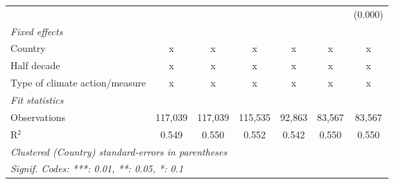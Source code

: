 \begin{tabular}{lcccccc}
                                                     &         &                &               &                &                & (0.000)\\   
   \emph{Fixed effects}\\
   Country                                           & x       & x              & x             & x              & x              & x\\  
   Half decade                                       & x       & x              & x             & x              & x              & x\\  
   Type of climate action/measure                    & x       & x              & x             & x              & x              & x\\  
   \midrule \emph{Fit statistics}\\
   Observations                                      & 117,039 & 117,039        & 115,535       & 92,863         & 83,567         & 83,567\\  
   R$^2$                                             & 0.549   & 0.550          & 0.552         & 0.542          & 0.550          & 0.550\\  
   \midrule
   \multicolumn{7}{l}{\emph{Clustered (Country) standard-errors in parentheses}}\\
   \multicolumn{7}{l}{\emph{Signif. Codes: ***: 0.01, **: 0.05, *: 0.1}}\\
\end{tabular}
\par\endgroup


